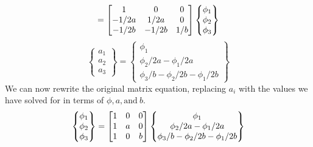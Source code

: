 \documentclass[12pt,letterpaper]{article}
\begin{document}
\begin{enumerate}[label=(\alph*)]
\begin{enumerate}[label=\arabic*.]
\begin{equation*}
				= \mqty[1 & 0 & 0 \\ -1/2a & 1/2a & 0 \\ -1/2b & -1/2b & 1/b]
				\begin{Bmatrix}
					\phi_1 \\ \phi_2 \\ \phi_3
				\end{Bmatrix}
			\end{equation*}
			\begin{equation*}
				\begin{Bmatrix}
					a_1 \\ a_2 \\ a_3
				\end{Bmatrix}
				= 
				\begin{Bmatrix}
					\phi_1 \\ \phi_2/2a - \phi_1/2a \\ \phi_3/b - \phi_2/2b - \phi_1/2b
				\end{Bmatrix}
			\end{equation*}
			We can now rewrite the original matrix equation, replacing $a_i$ with the values we have solved for in terms of $\phi, a, \textrm{and} \ b$.
			\begin{equation*}
				\begin{Bmatrix}
					\phi_1 \\ \phi_2 \\ \phi_3
				\end{Bmatrix}
				= \mqty[1 & 0 & 0 \\ 1 & a & 0 \\ 1 & 0 & b]
				\begin{Bmatrix}
					\phi_1 \\ \phi_2/2a - \phi_1/2a \\ \phi_3/b - \phi_2/2b - \phi_1/2b
				\end{Bmatrix}
			\end{equation*}


\end{enumerate}
\end{enumerate}
\end{document}
